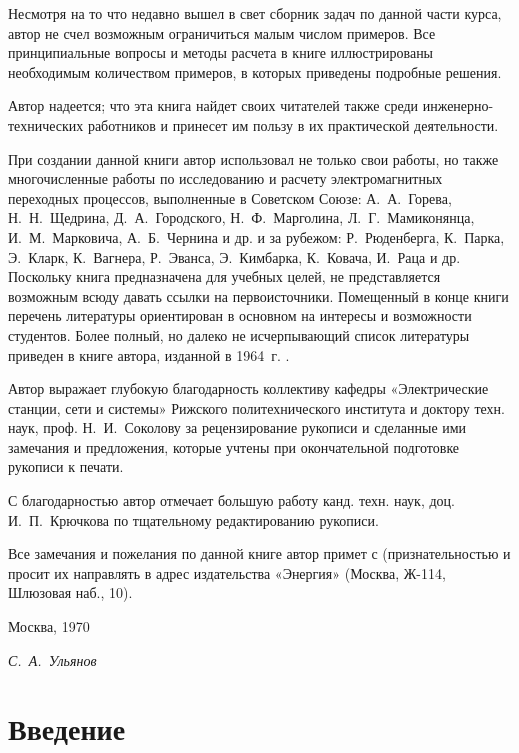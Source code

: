 Несмотря на то что недавно вышел в свет сборник задач по данной части курса, автор не счел возможным ограничиться малым числом примеров. Все принципиальные вопросы и методы расчета в книге иллюстрированы необходимым количеством примеров, в которых приведены подробные решения.

Автор надеется; что эта книга найдет своих читателей также среди инженерно-технических работников и принесет им пользу в их практической деятельности.

При создании данной книги автор использовал не только свои работы, но также многочисленные работы по исследованию и расчету электромагнитных переходных процессов, выполненные в Советском Союзе: А.~А.~Горева, Н.~Н.~Щедрина, Д.~А.~Городского, Н.~Ф.~Марголина, Л.~Г.~Мамиконянца, И.~М.~Марковича, А.~Б.~Чернина и др. и за рубежом: Р.~Рюденберга, К.~Парка, Э.~Кларк, К.~Вагнера, Р.~Эванса, Э.~Кимбарка, К.~Ковача, И.~Раца и др. Поскольку книга предназначена для учебных целей, не представляется возможным всюду давать ссылки на первоисточники. Помещенный в конце книги перечень литературы ориентирован в основном на интересы и возможности студентов. Более полный, но далеко не исчерпывающий список литературы приведен в книге автора, изданной в 1964~г. \cite{04Ulianov64}.

Автор выражает глубокую благодарность коллективу кафедры «Электрические станции, сети и системы» Рижского политехнического института и доктору техн. наук, проф. Н.~И.~Соколову за рецензирование рукописи и сделанные ими замечания и предложения, которые учтены при окончательной подготовке рукописи к печати.

С благодарностью автор отмечает большую работу канд. техн. наук, доц. И.~П.~Крючкова по тщательному редактированию рукописи.

Все замечания и пожелания по данной книге автор примет с (признательностью и просит их направлять в адрес издательства «Энергия» (Москва, Ж-114, Шлюзовая наб., 10).

\vspace{1pc}
\begin{minipage}{0.49\linewidth}
	Москва, 1970
\end{minipage}
\hfill
\begin{minipage}{0.49\linewidth}
	\flushright
	\textit{С.~А.~Ульянов}
\end{minipage}

\chapter*{Введение}
\label{chap:intro}

